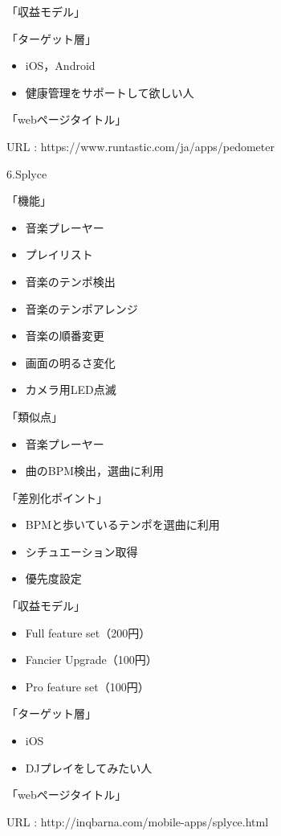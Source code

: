 「収益モデル」
\par
「ターゲット層」
\begin{itemize}
\item iOS，Android
\item 健康管理をサポートして欲しい人
\end{itemize}
「webページタイトル」
\par
URL : https://www.runtastic.com/ja/apps/pedometer
\\
\par
6.Splyce
\par
「機能」
\begin{itemize}
\item 音楽プレーヤー
\item プレイリスト
\item 音楽のテンポ検出
\item 音楽のテンポアレンジ
\item 音楽の順番変更
\item 画面の明るさ変化
\item カメラ用LED点滅
\end{itemize}

「類似点」
\begin{itemize}
\item 音楽プレーヤー
\item 曲のBPM検出，選曲に利用
\end{itemize}

「差別化ポイント」
\begin{itemize}
\item BPMと歩いているテンポを選曲に利用
\item シチュエーション取得
\item 優先度設定
\end{itemize}

「収益モデル」
\begin{itemize}
\item Full feature set（200円）
\item Fancier Upgrade（100円）
\item Pro feature set（100円）
\end{itemize}

「ターゲット層」
\begin{itemize}
\item iOS
\item DJプレイをしてみたい人
\end{itemize}
「webページタイトル」
\par
URL : http://inqbarna.com/mobile-apps/splyce.html

\par
{}
